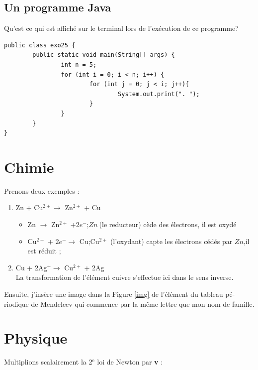 \documentclass[a4paper, 12pt]{article}
\begin{document}
            \newpage

            \subsection{Un programme Java}

            Qu'est ce qui est affich\'e sur le terminal lors de l'ex\'ecution de ce programme?
\begin{verbatim}
public class exo25 { 
        public static void main(String[] args) {
                int n = 5;
                for (int i = 0; i < n; i++) {
                        for (int j = 0; j < i; j++){
                                System.out.print(". ");
                        }
                }
        }
}
        \end{verbatim}
                	
            \section{Chimie}

            Prenons deux exemples :
            \begin{enumerate}
                \item Zn + Cu$^{2+} \rightarrow$ Zn$^{2+}$ + Cu
                \begin{itemize}
                    \item Zn $\rightarrow$ Zn$^{2+}$ +$2 e^{-}$;$Zn~$(le reducteur) c\`ede des \'electrons, il est oxyd\'e
                    \item Cu$^{2+}$ + $2e^- \rightarrow$ Cu;Cu$^{2+}$ (l'oxydant) capte les \'electrons c\'ed\'es par $Zn$,il est r\'eduit ;
                \end{itemize}
                \item Cu + 2Ag$^+ \rightarrow$ Cu$^{2+}$ + 2Ag\\
                La transformation de l'\'el\'ement cuivre s'effectue ici dans le sens inverse.
            \end{enumerate}
            Ensuite, j'ins\`ere une image dans la Figure \ref{img} de l'\'el\'ement du tableau p\'e-riodique de Mendeleev qui commence par la m\^eme lettre que mon nom de famille.
            
            \section{Physique}
            \flushleft
            Multiplions scalairement la 2$^\text{e}$ loi de Newton par \textbf{v} :
            
\end{document}
